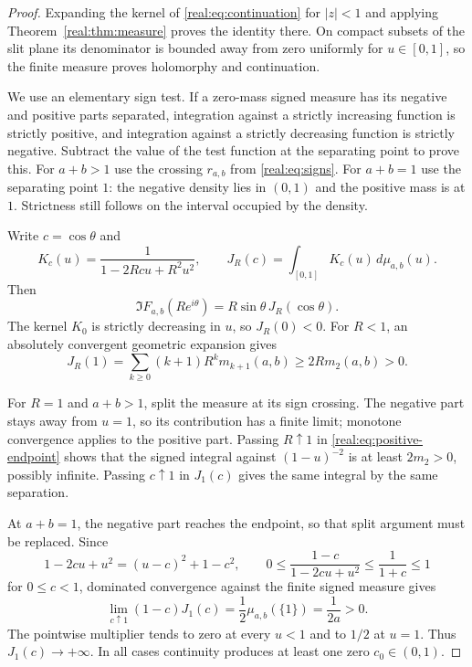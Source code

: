 \begin{proof}
Expanding the kernel of \eqref{real:eq:continuation} for $|z|<1$
and applying Theorem~\ref{real:thm:measure} proves the identity
there. On compact subsets of the slit plane its denominator is
bounded away from zero uniformly for $u\in[0,1]$, so the finite
measure proves holomorphy and continuation.

We use an elementary sign test. If a zero-mass signed measure has
its negative and positive parts separated, integration against a
strictly increasing function is strictly positive, and integration
against a strictly decreasing function is strictly negative.
Subtract the value of the test function at the separating point to
prove this. For $a+b>1$ use the crossing $r_{a,b}$ from
\eqref{real:eq:signs}. For $a+b=1$ use the separating point $1$:
the negative density lies in $(0,1)$ and the positive mass is at $1$.
Strictness still follows on the interval occupied by the density.

Write $c=\cos\theta$ and
\[
 K_c(u)=\frac1{1-2Rcu+R^2u^2},\qquad
 J_R(c)=\int_{[0,1]}K_c(u)\,d\mu_{a,b}(u).
\]
Then
\begin{equation}\label{real:eq:angular-J}
 \Im F_{a,b}(Re^{i\theta})=R\sin\theta\,J_R(\cos\theta).
\end{equation}
The kernel $K_0$ is strictly decreasing in $u$, so $J_R(0)<0$.
For $R<1$, an absolutely convergent geometric expansion gives
\begin{equation}\label{real:eq:positive-endpoint}
 J_R(1)=\sum_{k\geq0}(k+1)R^k m_{k+1}(a,b)
       \geq2R m_2(a,b)>0.
\end{equation}

For $R=1$ and $a+b>1$, split the measure at its sign crossing.
The negative part stays away from $u=1$, so its contribution has a
finite limit; monotone convergence applies to the positive part.
Passing $R\uparrow1$ in \eqref{real:eq:positive-endpoint} shows
that the signed integral against $(1-u)^{-2}$ is at least
$2m_2>0$, possibly infinite. Passing $c\uparrow1$ in $J_1(c)$
gives the same integral by the same separation.

At $a+b=1$, the negative part reaches the endpoint, so that split
argument must be replaced. Since
\[
 1-2cu+u^2=(u-c)^2+1-c^2,\qquad
 0\leq\frac{1-c}{1-2cu+u^2}\leq\frac1{1+c}\leq1
\]
for $0\leq c<1$, dominated convergence against the finite signed
measure gives
\begin{equation}\label{real:eq:critical-endpoint}
 \lim_{c\uparrow1}(1-c)J_1(c)
 =\frac12\mu_{a,b}(\{1\})=\frac1{2a}>0.
\end{equation}
The pointwise multiplier tends to zero at every $u<1$ and to
$1/2$ at $u=1$. Thus $J_1(c)\to+\infty$. In all cases continuity
produces at least one zero $c_0\in(0,1)$.


\end{proof}
